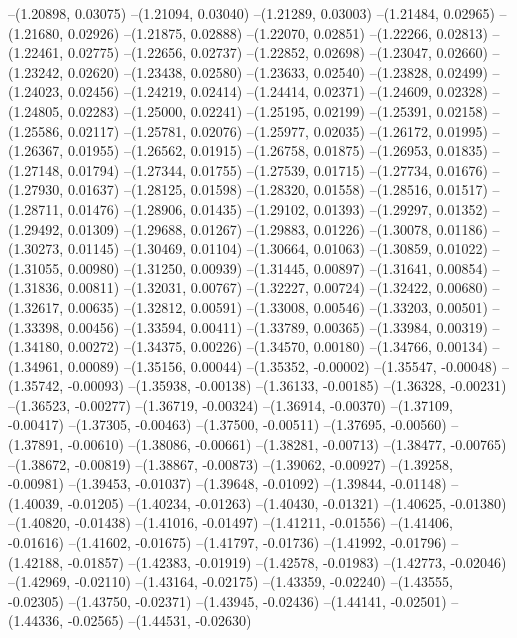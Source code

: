 --(1.20898, 0.03075)
--(1.21094, 0.03040)
--(1.21289, 0.03003)
--(1.21484, 0.02965)
--(1.21680, 0.02926)
--(1.21875, 0.02888)
--(1.22070, 0.02851)
--(1.22266, 0.02813)
--(1.22461, 0.02775)
--(1.22656, 0.02737)
--(1.22852, 0.02698)
--(1.23047, 0.02660)
--(1.23242, 0.02620)
--(1.23438, 0.02580)
--(1.23633, 0.02540)
--(1.23828, 0.02499)
--(1.24023, 0.02456)
--(1.24219, 0.02414)
--(1.24414, 0.02371)
--(1.24609, 0.02328)
--(1.24805, 0.02283)
--(1.25000, 0.02241)
--(1.25195, 0.02199)
--(1.25391, 0.02158)
--(1.25586, 0.02117)
--(1.25781, 0.02076)
--(1.25977, 0.02035)
--(1.26172, 0.01995)
--(1.26367, 0.01955)
--(1.26562, 0.01915)
--(1.26758, 0.01875)
--(1.26953, 0.01835)
--(1.27148, 0.01794)
--(1.27344, 0.01755)
--(1.27539, 0.01715)
--(1.27734, 0.01676)
--(1.27930, 0.01637)
--(1.28125, 0.01598)
--(1.28320, 0.01558)
--(1.28516, 0.01517)
--(1.28711, 0.01476)
--(1.28906, 0.01435)
--(1.29102, 0.01393)
--(1.29297, 0.01352)
--(1.29492, 0.01309)
--(1.29688, 0.01267)
--(1.29883, 0.01226)
--(1.30078, 0.01186)
--(1.30273, 0.01145)
--(1.30469, 0.01104)
--(1.30664, 0.01063)
--(1.30859, 0.01022)
--(1.31055, 0.00980)
--(1.31250, 0.00939)
--(1.31445, 0.00897)
--(1.31641, 0.00854)
--(1.31836, 0.00811)
--(1.32031, 0.00767)
--(1.32227, 0.00724)
--(1.32422, 0.00680)
--(1.32617, 0.00635)
--(1.32812, 0.00591)
--(1.33008, 0.00546)
--(1.33203, 0.00501)
--(1.33398, 0.00456)
--(1.33594, 0.00411)
--(1.33789, 0.00365)
--(1.33984, 0.00319)
--(1.34180, 0.00272)
--(1.34375, 0.00226)
--(1.34570, 0.00180)
--(1.34766, 0.00134)
--(1.34961, 0.00089)
--(1.35156, 0.00044)
--(1.35352, -0.00002)
--(1.35547, -0.00048)
--(1.35742, -0.00093)
--(1.35938, -0.00138)
--(1.36133, -0.00185)
--(1.36328, -0.00231)
--(1.36523, -0.00277)
--(1.36719, -0.00324)
--(1.36914, -0.00370)
--(1.37109, -0.00417)
--(1.37305, -0.00463)
--(1.37500, -0.00511)
--(1.37695, -0.00560)
--(1.37891, -0.00610)
--(1.38086, -0.00661)
--(1.38281, -0.00713)
--(1.38477, -0.00765)
--(1.38672, -0.00819)
--(1.38867, -0.00873)
--(1.39062, -0.00927)
--(1.39258, -0.00981)
--(1.39453, -0.01037)
--(1.39648, -0.01092)
--(1.39844, -0.01148)
--(1.40039, -0.01205)
--(1.40234, -0.01263)
--(1.40430, -0.01321)
--(1.40625, -0.01380)
--(1.40820, -0.01438)
--(1.41016, -0.01497)
--(1.41211, -0.01556)
--(1.41406, -0.01616)
--(1.41602, -0.01675)
--(1.41797, -0.01736)
--(1.41992, -0.01796)
--(1.42188, -0.01857)
--(1.42383, -0.01919)
--(1.42578, -0.01983)
--(1.42773, -0.02046)
--(1.42969, -0.02110)
--(1.43164, -0.02175)
--(1.43359, -0.02240)
--(1.43555, -0.02305)
--(1.43750, -0.02371)
--(1.43945, -0.02436)
--(1.44141, -0.02501)
--(1.44336, -0.02565)
--(1.44531, -0.02630)
